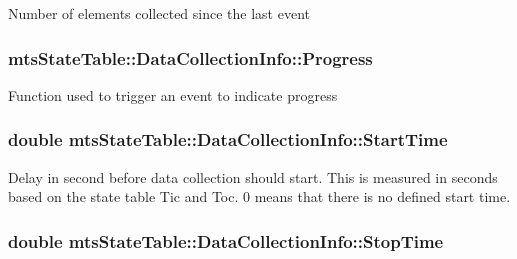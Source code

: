 Number of elements collected since the last event \hypertarget{classmts_state_table_1_1_data_collection_info_ae4e104e80fed9252cf855f90dee1a1b9}{
\subsubsection[{Progress}]{ mts\-State\-Table\-::\-Data\-Collection\-Info\-::\-Progress}}\label{classmts_state_table_1_1_data_collection_info_ae4e104e80fed9252cf855f90dee1a1b9}
Function used to trigger an event to indicate progress \hypertarget{classmts_state_table_1_1_data_collection_info_a6142e6c6599148b1eadf002c9880463f}{
\subsubsection[{Start\-Time}]{\setlength{\rightskip}{0pt plus 5cm}double mts\-State\-Table\-::\-Data\-Collection\-Info\-::\-Start\-Time}}\label{classmts_state_table_1_1_data_collection_info_a6142e6c6599148b1eadf002c9880463f}
Delay in second before data collection should start. This is measured in seconds based on the state table Tic and Toc. 0 means that there is no defined start time. \hypertarget{classmts_state_table_1_1_data_collection_info_a9b815a904966196b006f88d2dc0e73b4}{
\subsubsection[{Stop\-Time}]{\setlength{\rightskip}{0pt plus 5cm}double mts\-State\-Table\-::\-Data\-Collection\-Info\-::\-Stop\-Time}}\label{classmts_state_table_1_1_data_collection_info_a9b815a904966196b006f88d2dc0e73b4}
